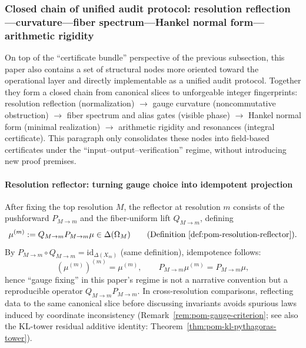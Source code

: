 
\subsubsection{Closed chain of unified audit protocol: resolution reflection—curvature—fiber spectrum—Hankel normal form—arithmetic rigidity}\label{subsubsec:discussion-audit-kernel-closed-loop}
On top of the ``certificate bundle'' perspective of the previous subsection, this paper also contains a set of structural nodes more oriented toward the operational layer and directly implementable as a unified audit protocol.
Together they form a closed chain from canonical slices to unforgeable integer fingerprints:
resolution reflection (normalization) \(\to\) gauge curvature (noncommutative obstruction) \(\to\) fiber spectrum and alias gates (visible phase) \(\to\) Hankel normal form (minimal realization) \(\to\) arithmetic rigidity and resonances (integral certificate).
This paragraph only consolidates these nodes into field-based certificates under the ``input–output–verification'' regime, without introducing new proof premises.

\paragraph{Resolution reflector: turning gauge choice into idempotent projection}
After fixing the top resolution \(M\), the reflector at resolution \(m\) consists of the pushforward \(P_{M\to m}\) and the fiber-uniform lift \(Q_{M\to m}\), defining
\[
\mu^{(m)}:=Q_{M\to m}P_{M\to m}\mu\in\Delta(\Omega_M)
\qquad\text{(Definition~\ref{def:pom-resolution-reflector})}.
\]
By \(P_{M\to m}\circ Q_{M\to m}=\mathrm{id}_{\Delta(X_m)}\) (same definition), idempotence follows:
\[
(\mu^{(m)})^{(m)}=\mu^{(m)},
\qquad
P_{M\to m}\mu^{(m)}=P_{M\to m}\mu,
\]
hence ``gauge fixing'' in this paper's regime is not a narrative convention but a reproducible operator \(Q_{M\to m}P_{M\to m}\).
In cross-resolution comparisons, reflecting data to the same canonical slice before discussing invariants avoids spurious laws induced by coordinate inconsistency (Remark~\ref{rem:pom-gauge-criterion}; see also the KL-tower residual additive identity: Theorem~\ref{thm:pom-kl-pythagoras-tower}).

